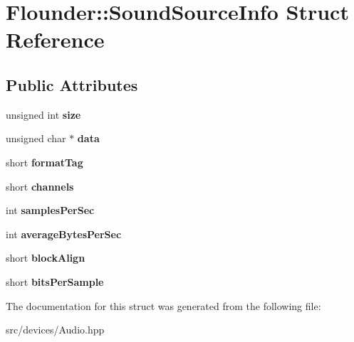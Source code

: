 \hypertarget{struct_flounder_1_1_sound_source_info}{}\section{Flounder\+:\+:Sound\+Source\+Info Struct Reference}
\label{struct_flounder_1_1_sound_source_info}
\subsection*{Public Attributes}
\begin{DoxyCompactItemize}
\item 
\mbox{\label{struct_flounder_1_1_sound_source_info_a8dfb43ba55b967827ba62df252fda13b}} 
unsigned int {\bfseries size}
\item 
\mbox{\label{struct_flounder_1_1_sound_source_info_a1fbbd9c7397b3baee3309282e78a3c44}} 
unsigned char $\ast$ {\bfseries data}
\item 
\mbox{\label{struct_flounder_1_1_sound_source_info_a99f60f2cda8bfc349166d982f79b982f}} 
short {\bfseries format\+Tag}
\item 
\mbox{\label{struct_flounder_1_1_sound_source_info_aa731681dc7bf6fde886a887a48bf78ea}} 
short {\bfseries channels}
\item 
\mbox{\label{struct_flounder_1_1_sound_source_info_aa3a18253db63ad95d399ff7dcd5df217}} 
int {\bfseries samples\+Per\+Sec}
\item 
\mbox{\label{struct_flounder_1_1_sound_source_info_a9f2acb601af21f4466ff4b539e951594}} 
int {\bfseries average\+Bytes\+Per\+Sec}
\item 
\mbox{\label{struct_flounder_1_1_sound_source_info_a2116b7393586d0c68c0bd763847eb0cd}} 
short {\bfseries block\+Align}
\item 
\mbox{\label{struct_flounder_1_1_sound_source_info_a52861cbfa13f256af80623075913a5f0}} 
short {\bfseries bits\+Per\+Sample}
\end{DoxyCompactItemize}


The documentation for this struct was generated from the following file\+:\begin{DoxyCompactItemize}
\item 
src/devices/Audio.\+hpp\end{DoxyCompactItemize}
